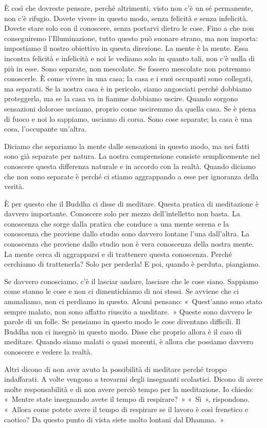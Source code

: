 È così che dovreste pensare, perché altrimenti, visto non c'è un sé
permanente, non c'è rifugio. Dovete vivere in questo modo, senza
felicità e senza infelicità. Dovete stare solo con il conoscere, senza
portarvi dietro le cose. Fino a che non conseguiremo l'Illuminazione,
tutto questo può suonare strano, ma non importa: impostiamo il nostro
obiettivo in questa direzione. La mente è la mente. Essa incontra
felicità e infelicità e noi le vediamo solo in quanto tali, non c'è
nulla di più in esse. Sono separate, non mescolate. Se fossero mescolate
non potremmo conoscerle. È come vivere in una casa; la casa e i suoi
occupanti sono collegati, ma separati. Se la nostra casa è in pericolo,
siamo angosciati perché dobbiamo proteggerla, ma se la casa va in fiamme
dobbiamo uscire. Quando sorgono sensazioni dolorose usciamo, proprio
come usciremmo da quella casa. Se è piena di fuoco e noi lo sappiamo,
usciamo di corsa. Sono cose separate; la casa è una cosa, l'occupante
un'altra.

Diciamo che separiamo la mente dalle sensazioni in questo modo, ma nei
fatti sono già separate per natura. La nostra comprensione consiste
semplicemente nel conoscere questa differenza naturale e in accordo con
la realtà. Quando diciamo che non sono separate è perché ci stiamo
aggrappando a esse per ignoranza della verità.

È per questo che il Buddha ci disse di meditare. Questa pratica di
meditazione è davvero importante. Conoscere solo per mezzo
dell'intelletto non basta. La conoscenza che sorge dalla pratica che
conduce a una mente serena e la conoscenza che proviene dallo studio
sono davvero lontane l'una dall'altra. La conoscenza che proviene dallo
studio non è vera conoscenza della nostra mente. La mente cerca di
aggrapparsi e di trattenere questa conoscenza. Perché cerchiamo di
trattenerla? Solo per perderla! E poi, quando è perduta, piangiamo.

Se davvero conosciamo, c'è il lasciar andare, lasciare che le cose
siano. Sappiamo come stanno le cose e non ci dimentichiamo di noi
stessi. Se avviene che ci ammaliamo, non ci perdiamo in questo. Alcuni
pensano: «~Quest'anno sono stato sempre malato, non sono affatto
riuscito a meditare.~» Queste sono davvero le parole di un folle. Se
pensiamo in questo modo le cose diventano difficili. Il Buddha non ci
insegnò in questo modo. Disse che proprio allora è il caso di meditare.
Quando siamo malati o quasi morenti, è allora che possiamo davvero
conoscere e vedere la realtà.

Altri dicono di non aver avuto la possibilità di meditare perché troppo
indaffarati. A volte vengono a trovarmi degli insegnanti scolastici.
Dicono di avere molte responsabilità e di non avere perciò tempo per la
meditazione. Io chiedo: «~Mentre state insegnando avete il tempo di
respirare?~» «~Sì~», rispondono. «~Allora come potete avere il tempo di
respirare se il lavoro è così frenetico e caotico? Da questo punto di
vista siete molto lontani dal Dhamma.~»

